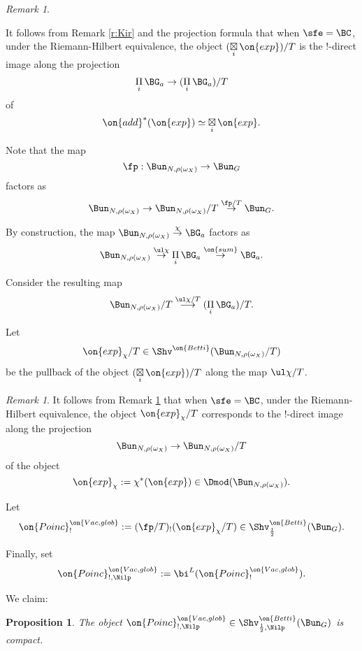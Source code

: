 \documentclass[9pt]{amsart}
\newtheorem{prop}[subsubsection]{Proposition}
\theoremstyle{remark}
\newtheorem{rem}[subsubsection]{Remark}
\theoremstyle{definition}
\theoremstyle{remark}
\numberwithin{equation}{section}
\begin{document}
\begin{rem}  \label{r:exp r/T}

It follows from Remark \ref{r:Kir} and the projection formula that when $\sfe=\BC$, under the Riemann-Hilbert equivalence, the object  
$(\underset{i}\boxtimes\, \on{exp})/T$ is the !-direct image along the projection 
$$\underset{i}\Pi\, \BG_a\to (\underset{i}\Pi\, \BG_a)/T$$
of 
$$\on{add}^*(\on{exp})\simeq \underset{i}\boxtimes\, \on{exp}.$$

\end{rem} 

\sssec{} \label{sss:exp chi/T}

Note that the map 
$$\fp:\Bun_{N,\rho(\omega_X)}\to \Bun_G$$
factors as
$$\Bun_{N,\rho(\omega_X)}\to \Bun_{N,\rho(\omega_X)}/T \overset{\fp/T}\to \Bun_G.$$

By construction, the map $\Bun_{N,\rho(\omega_X)}\overset{\chi}\to \BG_a$ factors as
$$\Bun_{N,\rho(\omega_X)}\overset{\ul\chi}\to \underset{i}\Pi\, \BG_a\overset{\on{sum}}\to \BG_a.$$

\medskip

Consider the resulting map
$$\Bun_{N,\rho(\omega_X)}/T\overset{\ul\chi/T}\longrightarrow
(\underset{i}\Pi\, \BG_a)/T.$$

\medskip

Let 
$$\on{exp}_\chi/T\in \Shv^{\on{Betti}}(\Bun_{N,\rho(\omega_X)}/T)$$
be the pullback of the object $(\underset{i}\boxtimes\, \on{exp})/T$ along the map $\ul\chi/T$. 

\begin{rem} \label{r:exp chi/T}
It follows from Remark \ref{r:exp r/T} that when $\sfe=\BC$, under the Riemann-Hilbert equivalence, the object $\on{exp}_\chi/T$
corresponds to the !-direct image along the projection
$$\Bun_{N,\rho(\omega_X)}\to \Bun_{N,\rho(\omega_X)}/T$$
of the object
$$\on{exp}_\chi:=\chi^*(\on{exp})\in \Dmod(\Bun_{N,\rho(\omega_X)}).$$
\end{rem} 

\sssec{} 

Let 
$$\on{Poinc}^{\on{Vac,glob}}_!:=(\fp/T)_!(\on{exp}_\chi/T) \in \Shv^{\on{Betti}}_{\frac{1}{2}}(\Bun_G).$$

\medskip

Finally, set
$$\on{Poinc}^{\on{Vac,glob}}_{!,\Nilp}:=\bi^L(\on{Poinc}^{\on{Vac,glob}}_!).$$

\sssec{}

We claim:

\begin{prop} \label{p:Poinc Nilp comp}
The object $\on{Poinc}^{\on{Vac,glob}}_{!,\Nilp}\in \Shv^{\on{Betti}}_{\frac{1}{2},\Nilp}(\Bun_G)$
is compact.
\end{prop}
\end{document}
